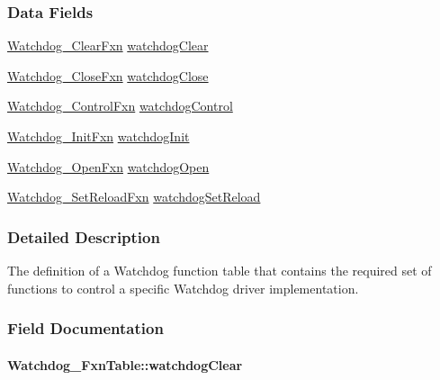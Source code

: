 \subsubsection*{Data Fields}
\begin{DoxyCompactItemize}
\item 
\hyperlink{_watchdog_8h_a0315c4931ba68423472f47c23c86f296}{Watchdog\+\_\+\+Clear\+Fxn} \hyperlink{struct_watchdog___fxn_table_a925066f771f1c4ad0e8607e8aa6aee4f}{watchdog\+Clear}
\item 
\hyperlink{_watchdog_8h_a2d13686bc3dd7fdb05ec97d63be489ee}{Watchdog\+\_\+\+Close\+Fxn} \hyperlink{struct_watchdog___fxn_table_a4e8c8b1da4a51c4b76d33e702637f326}{watchdog\+Close}
\item 
\hyperlink{_watchdog_8h_afb5bd0153345db8f4a7a6a8756b90447}{Watchdog\+\_\+\+Control\+Fxn} \hyperlink{struct_watchdog___fxn_table_a415d44b4771fd48395105c5644a14429}{watchdog\+Control}
\item 
\hyperlink{_watchdog_8h_a6401b1a23d9048efb4ed69a074ea60f9}{Watchdog\+\_\+\+Init\+Fxn} \hyperlink{struct_watchdog___fxn_table_a098c5fc8de0d3bf2071960387156c3a2}{watchdog\+Init}
\item 
\hyperlink{_watchdog_8h_a05ae778da809a34e4d84c95d35ba5f58}{Watchdog\+\_\+\+Open\+Fxn} \hyperlink{struct_watchdog___fxn_table_aaff59460698cbba41fca6660c44ee9c0}{watchdog\+Open}
\item 
\hyperlink{_watchdog_8h_ab6ef6008c6bbc7d34b5638458e1ae5c1}{Watchdog\+\_\+\+Set\+Reload\+Fxn} \hyperlink{struct_watchdog___fxn_table_aff9226f8aff3780cf4a05d3e0adf7ea4}{watchdog\+Set\+Reload}
\end{DoxyCompactItemize}


\subsubsection{Detailed Description}
The definition of a Watchdog function table that contains the required set of functions to control a specific Watchdog driver implementation. 

\subsubsection{Field Documentation}
\paragraph[{watchdog\+Clear}]{ Watchdog\+\_\+\+Fxn\+Table\+::watchdog\+Clear}\label{struct_watchdog___fxn_table_a925066f771f1c4ad0e8607e8aa6aee4f}
